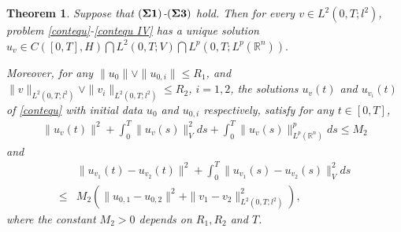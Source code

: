 \documentclass[11pt]{article}
\numberwithin{equation}{section}
\theoremstyle{plain}
\newtheorem{theorem}{Theorem}[section]
\def\leq{\leqslant}
\begin{document}
\begin{theorem}\label{cewellposed}
  Suppose that $({\bf \Sigma 1})$-$({\bf \Sigma 3})$ hold.
  Then for every $v \in L^2(0,T; l^2)$,
  problem \eqref{contequ}-\eqref{contequ IV} has a unique solution
    $ u_v \in C([0,T], H) \bigcap L^2(0,T; V) \bigcap L^p(0,T; L^p(\mathbb{R}^n)). $

  Moreover, for any
      $\| u_{0} \| \vee \| u_{0,i} \| \leq R_1$,
  and $\| v \|_{L^2(0, T; l^2)} \vee \| v_i \|_{L^2(0, T; l^2)} \leq R_2$,
      $i = 1,2$,
  the solutions $u_v(t)$ and $u_{v_i}(t)$ of \eqref{contequ}
  with initial data $u_0$ and $u_{0,i}$ respectively,
  satisfy for any $t \in [0,T]$,
  \begin{align}\label{dceue}
      \| u_{v}(t) \|^2
      + \int_0^T \| u_v(s) \|_V^2 ds
      + \int_0^T \| u_v(s) \|_{L^p(\mathbb{R}^n)}^p ds
      \leq M_2
  \end{align}
  and
  \begin{align} \label{dcelip}
         & \| u_{v_1}(t) - u_{v_2}(t)
         \|^2
           + \int_0^T \| u_{v_1}(s) - u_{v_2}(s) \|_V^2 ds
             \nonumber\\
    \leq & M_2
               \left( \| u_{0,1} - u_{0,2} \|^2
                      + \| v_1 - v_2 \|^2_{L^2(0, T; l^2)}
               \right),
  \end{align}
  where the constant $M_2 > 0$ depends on $R_1, R_2$ and $T$.
\end{theorem}
\end{document}
